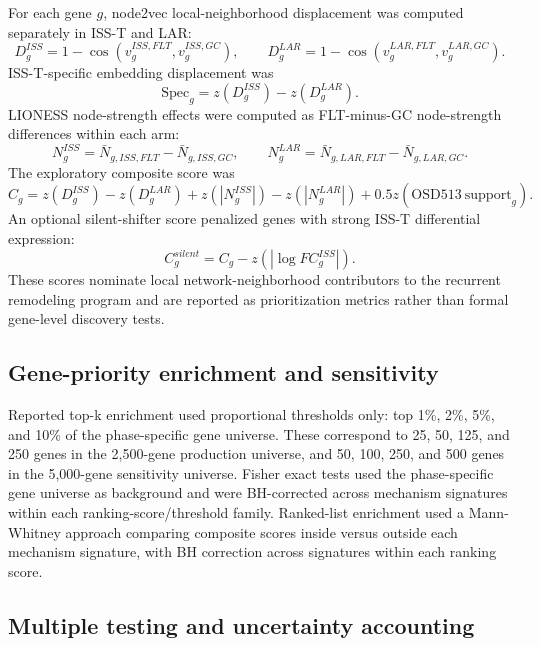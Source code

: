 \documentclass[11pt]{article}
\begin{document}
For each gene $g$, node2vec local-neighborhood displacement was computed separately in ISS-T and LAR:
\begin{equation}
D_g^{ISS}=1-\cos(v^{ISS,FLT}_g,v^{ISS,GC}_g),
\qquad
D_g^{LAR}=1-\cos(v^{LAR,FLT}_g,v^{LAR,GC}_g).
\end{equation}
ISS-T-specific embedding displacement was
\begin{equation}
\mathrm{Spec}_g=z(D_g^{ISS})-z(D_g^{LAR}).
\end{equation}
LIONESS node-strength effects were computed as FLT-minus-GC node-strength differences within each arm:
\begin{equation}
N_g^{ISS}=\bar{N}_{g,ISS,FLT}-\bar{N}_{g,ISS,GC},
\qquad
N_g^{LAR}=\bar{N}_{g,LAR,FLT}-\bar{N}_{g,LAR,GC}.
\end{equation}
The exploratory composite score was
\begin{equation}
C_g=z(D_g^{ISS})-z(D_g^{LAR})+z(|N_g^{ISS}|)-z(|N_g^{LAR}|)+0.5z(\mathrm{OSD513\ support}_g).
\end{equation}
An optional silent-shifter score penalized genes with strong ISS-T differential expression:
\begin{equation}
C^{silent}_g=C_g-z(|\log FC_g^{ISS}|).
\end{equation}
These scores nominate local network-neighborhood contributors to the recurrent remodeling program and are reported as prioritization metrics rather than formal gene-level discovery tests.

\subsection{Gene-priority enrichment and sensitivity}

Reported top-k enrichment used proportional thresholds only: top 1\%, 2\%, 5\%, and 10\% of the phase-specific gene universe. These correspond to 25, 50, 125, and 250 genes in the 2,500-gene production universe, and 50, 100, 250, and 500 genes in the 5,000-gene sensitivity universe. Fisher exact tests used the phase-specific gene universe as background and were BH-corrected across mechanism signatures within each ranking-score/threshold family. Ranked-list enrichment used a Mann-Whitney approach comparing composite scores inside versus outside each mechanism signature, with BH correction across signatures within each ranking score.

\subsection{Multiple testing and uncertainty accounting}
\end{document}
